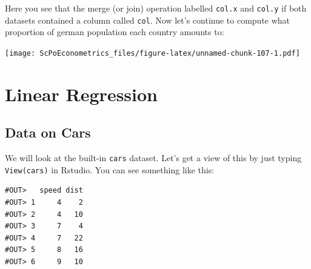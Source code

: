 \documentclass[]{book}
\newenvironment{Shaded}{\begin{snugshade}}{\end{snugshade}}
\newcommand{\KeywordTok}[1]{\textcolor[rgb]{0.13,0.29,0.53}{\textbf{#1}}}
\newcommand{\DataTypeTok}[1]{\textcolor[rgb]{0.13,0.29,0.53}{#1}}
\newcommand{\DecValTok}[1]{\textcolor[rgb]{0.00,0.00,0.81}{#1}}
\newcommand{\StringTok}[1]{\textcolor[rgb]{0.31,0.60,0.02}{#1}}
\newcommand{\CommentTok}[1]{\textcolor[rgb]{0.56,0.35,0.01}{\textit{#1}}}
\newcommand{\OperatorTok}[1]{\textcolor[rgb]{0.81,0.36,0.00}{\textbf{#1}}}
\newcommand{\NormalTok}[1]{#1}
\theoremstyle{definition}
\theoremstyle{definition}
\theoremstyle{definition}
\theoremstyle{remark}
\begin{document}
Here you see that the merge (or join) operation labelled \texttt{col.x}
and \texttt{col.y} if both datasets contained a column called
\texttt{col}. Now let's continue to compute what proportion of german
population each country amounts to:

\begin{Shaded}
\end{Shaded}

\texttt{[image: ScPoEconometrics\_files/figure-latex/unnamed-chunk-107-1.pdf]}

\chapter{Linear Regression}\label{linreg}

\section{Data on Cars}\label{data-on-cars}

We will look at the built-in \texttt{cars} dataset. Let's get a view of
this by just typing \texttt{View(cars)} in Rstudio. You can see
something like this:

\begin{verbatim}
#OUT>   speed dist
#OUT> 1     4    2
#OUT> 2     4   10
#OUT> 3     7    4
#OUT> 4     7   22
#OUT> 5     8   16
#OUT> 6     9   10
\end{verbatim}
\end{document}
